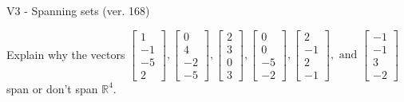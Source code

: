 \begin{exercise}
  \begin{exerciseTitle}V3 - Spanning sets (ver. 168)\end{exerciseTitle}
  \begin{exerciseStatement}
    Explain why the vectors \(\left[\begin{array}{r}
1 \\
-1 \\
-5 \\
2
\end{array}\right] , \left[\begin{array}{r}
0 \\
4 \\
-2 \\
-5
\end{array}\right] , \left[\begin{array}{r}
2 \\
3 \\
0 \\
3
\end{array}\right] , \left[\begin{array}{r}
0 \\
0 \\
-5 \\
-2
\end{array}\right] , \left[\begin{array}{r}
2 \\
-1 \\
2 \\
-1
\end{array}\right] , \text{ and } \left[\begin{array}{r}
-1 \\
-1 \\
3 \\
-2
\end{array}\right]\) span or don't span \(\mathbb{R}^4\). 
	



\end{exerciseStatement}
\end{exercise}
